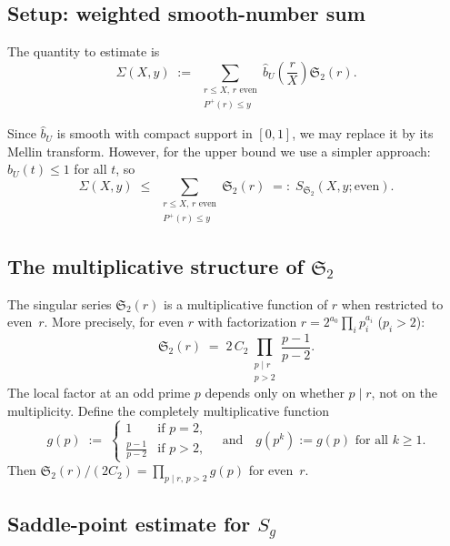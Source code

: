 \documentclass[11pt,reqno]{amsart}
\theoremstyle{plain}
\theoremstyle{definition}
\theoremstyle{remark}
\newcommand{\Sfrak}{\mathfrak{S}_2}
\newcommand{\Pplus}{P^{+}}
\begin{document}
\subsection{Setup: weighted smooth-number sum}

The quantity to estimate is
\begin{equation}\label{eq:target}
  \Sigma(X,y) \;:=\;
  \sum_{\substack{r \le X,\, r\text{ even} \\ \Pplus(r) \le y}}
  \hat{b}_U\!\left(\frac{r}{X}\right) \Sfrak(r).
\end{equation}

Since $\hat{b}_U$ is smooth with compact support in $[0,1]$, we may
replace it by its Mellin transform. However, for the upper bound we
use a simpler approach: $\hat{b}_U(t) \le 1$ for all $t$, so
\begin{equation}\label{eq:upper_simple}
  \Sigma(X,y) \;\le\;
  \sum_{\substack{r \le X,\, r\text{ even} \\ \Pplus(r) \le y}}
  \Sfrak(r)
  \;=:\; S_{\Sfrak}(X,y;\text{even}).
\end{equation}

\subsection{The multiplicative structure of $\Sfrak$}

The singular series $\Sfrak(r)$ is a multiplicative function of $r$
when restricted to even~$r$. More precisely, for even $r$ with
factorization $r = 2^{a_0} \prod_{i} p_i^{a_i}$ ($p_i > 2$):
\[
  \Sfrak(r) \;=\; 2\,C_2 \prod_{\substack{p \mid r \\ p > 2}}
  \frac{p-1}{p-2}.
\]
The local factor at an odd prime $p$ depends only on whether $p \mid r$,
not on the multiplicity. Define the completely multiplicative function
\begin{equation}\label{eq:g_def}
  g(p) \;:=\;
  \begin{cases}
    1 & \text{if } p = 2,\\
    \frac{p-1}{p-2} & \text{if } p > 2,
  \end{cases}
  \quad\text{and}\quad
  g(p^k) := g(p) \text{ for all } k \ge 1.
\end{equation}
Then $\Sfrak(r)/(2C_2) = \prod_{p \mid r,\, p > 2} g(p)$ for even~$r$.

\subsection{Saddle-point estimate for $S_g$}
\end{document}
